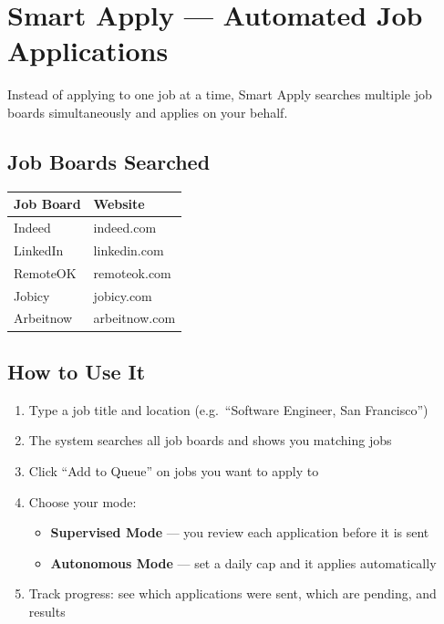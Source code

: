 \documentclass[12pt, a4paper]{report}
\begin{document}
\section{Smart Apply --- Automated Job Applications}

Instead of applying to one job at a time, Smart Apply searches multiple job boards
simultaneously and applies on your behalf.

\subsection{Job Boards Searched}

\begin{center}
\begin{tabular}{ll}
\toprule
\textbf{Job Board} & \textbf{Website} \\
\midrule
Indeed     & indeed.com \\
LinkedIn   & linkedin.com \\
RemoteOK   & remoteok.com \\
Jobicy     & jobicy.com \\
Arbeitnow  & arbeitnow.com \\
\bottomrule
\end{tabular}
\end{center}

\subsection{How to Use It}

\begin{enumerate}
  \item Type a job title and location (e.g.\ ``Software Engineer, San Francisco'')
  \item The system searches all job boards and shows you matching jobs
  \item Click ``Add to Queue'' on jobs you want to apply to
  \item Choose your mode:
        \begin{itemize}
          \item \textbf{Supervised Mode} --- you review each application before it is sent
          \item \textbf{Autonomous Mode} --- set a daily cap and it applies automatically
        \end{itemize}
  \item Track progress: see which applications were sent, which are pending, and results
\end{enumerate}
\end{document}
